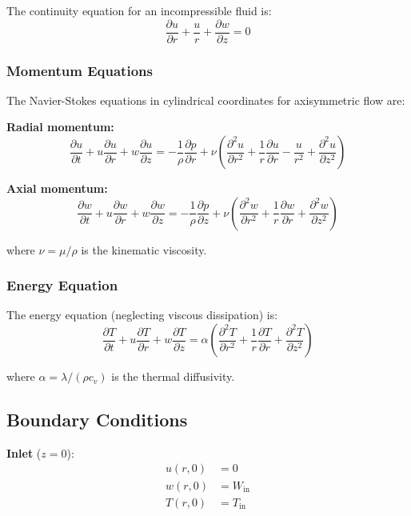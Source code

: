 \documentclass[12pt,a4paper]{article}
\newcommand{\parder}[2]{\frac{\partial #1}{\partial #2}}
\newcommand{\pparder}[2]{\frac{\partial^2 #1}{\partial {#2}^2}}
\begin{document}
The continuity equation for an incompressible fluid is:
\begin{equation}
    \parder{u}{r} + \frac{u}{r} + \parder{w}{z} = 0
    \label{eq:continuity_dim}
\end{equation}

\subsubsection{Momentum Equations}

The Navier-Stokes equations in cylindrical coordinates for axisymmetric flow are:

\textbf{Radial momentum:}
\begin{equation}
    \parder{u}{t} + u\parder{u}{r} + w\parder{u}{z} = -\frac{1}{\rho}\parder{p}{r} + \nu\left(\pparder{u}{r} + \frac{1}{r}\parder{u}{r} - \frac{u}{r^2} + \pparder{u}{z}\right)
    \label{eq:momentum_r_dim}
\end{equation}

\textbf{Axial momentum:}
\begin{equation}
    \parder{w}{t} + u\parder{w}{r} + w\parder{w}{z} = -\frac{1}{\rho}\parder{p}{z} + \nu\left(\pparder{w}{r} + \frac{1}{r}\parder{w}{r} + \pparder{w}{z}\right)
    \label{eq:momentum_z_dim}
\end{equation}

where $\nu = \mu/\rho$ is the kinematic viscosity.

\subsubsection{Energy Equation}

The energy equation (neglecting viscous dissipation) is:
\begin{equation}
    \parder{T}{t} + u\parder{T}{r} + w\parder{T}{z} = \alpha\left(\pparder{T}{r} + \frac{1}{r}\parder{T}{r} + \pparder{T}{z}\right)
    \label{eq:energy_dim}
\end{equation}

where $\alpha = \lambda/(\rho c_v)$ is the thermal diffusivity.

\subsection{Boundary Conditions}

\textbf{Inlet} ($z = 0$):
\begin{align}
    u(r, 0) &= 0 \\
    w(r, 0) &= W_{\text{in}} \\
    T(r, 0) &= T_{\text{in}}
\end{align}
\end{document}

